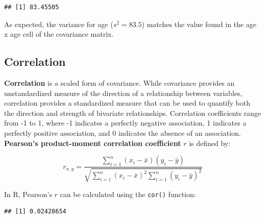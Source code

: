 \documentclass[
]{book}
\newenvironment{Shaded}{\begin{snugshade}}{\end{snugshade}}
\newcommand{\AttributeTok}[1]{\textcolor[rgb]{0.77,0.63,0.00}{#1}}
\newcommand{\CommentTok}[1]{\textcolor[rgb]{0.56,0.35,0.01}{\textit{#1}}}
\newcommand{\FunctionTok}[1]{\textcolor[rgb]{0.00,0.00,0.00}{#1}}
\newcommand{\NormalTok}[1]{#1}
\newcommand{\SpecialCharTok}[1]{\textcolor[rgb]{0.00,0.00,0.00}{#1}}
\newcommand{\StringTok}[1]{\textcolor[rgb]{0.31,0.60,0.02}{#1}}
\begin{document}
\begin{Shaded}
\end{Shaded}

\begin{verbatim}
## [1] 83.45505
\end{verbatim}

As expected, the variance for age (\(s^{2} = 83.5\)) matches the value found in the age x age cell of the covariance matrix.

\hypertarget{correlation}{%
\subsection{Correlation}\label{correlation}}

\textbf{Correlation} is a scaled form of covariance. While covariance provides an unstandardized measure of the direction of a relationship between variables, correlation provides a standardized measure that can be used to quantify both the direction and strength of bivariate relationships. Correlation coefficients range from -1 to 1, where -1 indicates a perfectly negative association, 1 indicates a perfectly positive association, and 0 indicates the absence of an association. \textbf{Pearson's product-moment correlation coefficient} \(r\) is defined by:

\[ r_{x,y} = \frac{\displaystyle\sum_{i=1}^{n} (x_{i}-\bar{x})(y_{i}-\bar{y})}{\sqrt{\displaystyle\sum_{i=1}^{n} (x_{i}-\bar{x})^2 \displaystyle\sum_{i=1}^{n} (y_{i}-\bar{y})^2}} \]

In R, Pearson's \(r\) can be calculated using the \texttt{cor()} function:

\begin{Shaded}
\end{Shaded}

\begin{verbatim}
## [1] 0.02428654
\end{verbatim}
\end{document}
